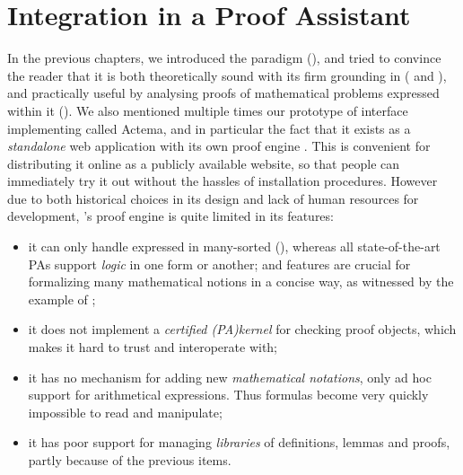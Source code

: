 \setchapterpreamble[u]{\margintoc}
\chapter{Integration in a Proof Assistant}

In the previous chapters, we introduced the  paradigm
(), and tried to convince the reader that it is both theoretically
sound with its firm grounding in   ( and
), and practically useful by analysing proofs of
mathematical problems expressed within it (). We also mentioned
multiple times our prototype of interface implementing  called
Actema, and in particular the fact that it exists as a \emph{standalone} web
application with its own proof engine . This is
convenient for distributing it online as a publicly available website, so that
people can immediately try it out without the hassles of installation
procedures. However due to both historical choices in its design and lack of
human resources for development, 's proof engine is quite limited in its
features:
\begin{itemize}
  \item it can only handle  expressed in many-sorted 
     (), whereas all state-of-the-art PAs support
    \emph{ logic} in one form or another; and  features
    are crucial for formalizing many mathematical notions in a concise way, as
    witnessed by the example of ;
  \item it does not implement a \emph{certified \kl(PA){kernel}} for checking
    proof objects, which makes it hard to trust and interoperate with;
  \item it has no mechanism for adding new \emph{mathematical notations}, only
    ad hoc support for arithmetical expressions. Thus formulas become very
    quickly impossible to read and manipulate;
  \item it has poor support for managing \emph{libraries} of definitions, lemmas
    and proofs, partly because of the previous items.
\end{itemize}

